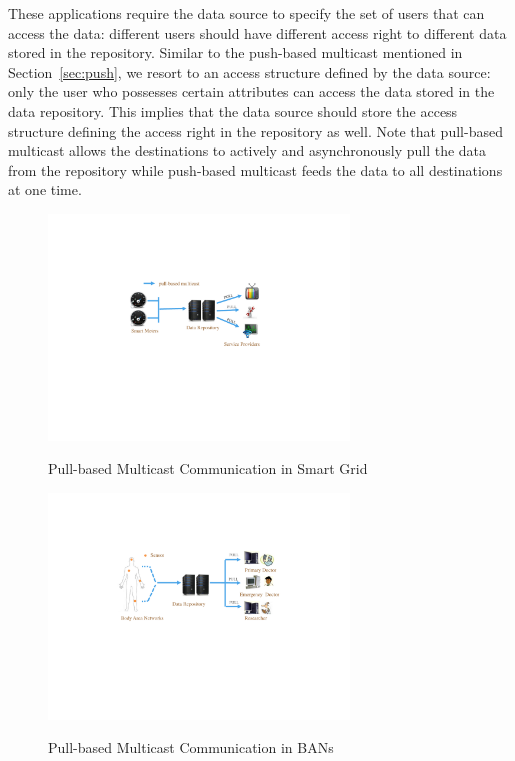 \documentclass[letterpaper,12pt]{article}
\begin{document}
 These applications require the data source to specify the set of users that can access the data: different users should have different access right to different data stored in the repository. Similar to the push-based multicast mentioned in Section~\ref{sec:push}, we resort to an access structure defined by the data source: only the user who possesses certain attributes can access the data stored in the data repository. This implies that the data source should store the access structure defining the access right in the repository as well.  Note that pull-based multicast allows the destinations to actively and asynchronously pull the data from the repository while push-based multicast feeds the data to all destinations at one time.

\begin{figure}[!htp]
\centering
 \includegraphics[width=8cm]{Smart_grid_pull}\\
 \centering \caption{Pull-based Multicast Communication in Smart Grid}\label{sec:Fig1:Smart_Grid_pull}
\end{figure}

\begin{figure}[!htp]
\centering
 \includegraphics[width=8cm]{Body_Area_Networks_pull}\\
 \centering \caption{Pull-based Multicast Communication in BANs}\label{sec:Fig2:BAN_pull}
\end{figure}
\end{document}
